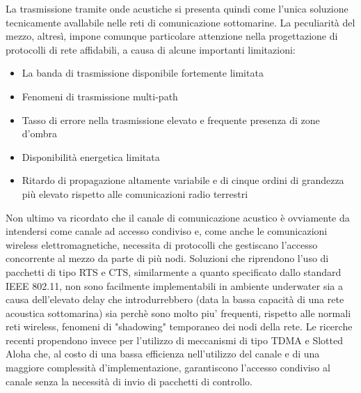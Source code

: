 \documentclass[Lau,binding=0.6cm]{sapthesis}
\begin{document}
La trasmissione tramite onde acustiche si presenta quindi come l'unica soluzione tecnicamente avallabile nelle reti di comunicazione sottomarine. La peculiarità del mezzo, altresì, impone comunque particolare attenzione nella progettazione di protocolli di rete affidabili, a causa di alcune importanti limitazioni:
\begin{itemize}

\item La banda di trasmissione disponibile fortemente limitata

\item Fenomeni di trasmissione multi-path

\item Tasso di errore nella trasmissione elevato e frequente presenza di zone d'ombra

\item Disponibilità energetica limitata

\item Ritardo di propagazione altamente variabile e di cinque ordini di grandezza più elevato rispetto alle comunicazioni radio terrestri
\end{itemize}

Non ultimo va ricordato che il canale di comunicazione acustico è ovviamente da intendersi come canale ad accesso condiviso e, come anche le comunicazioni wireless elettromagnetiche, necessita di protocolli che gestiscano l'accesso concorrente al mezzo da parte di più nodi. Soluzioni che riprendono l'uso di pacchetti di tipo RTS e CTS, similarmente a quanto specificato dallo standard IEEE 802.11, non sono facilmente implementabili in ambiente underwater sia a causa dell'elevato delay che introdurrebbero (data la bassa capacità di una rete acoustica sottomarina) sia perchè sono molto piu' frequenti, rispetto alle normali reti wireless, fenomeni di "shadowing" temporaneo dei nodi della rete. Le ricerche recenti propendono invece per l'utilizzo di meccanismi di tipo TDMA e Slotted Aloha che, al costo di una bassa efficienza nell'utilizzo del canale e di una maggiore complessità d'implementazione, garantiscono l'accesso condiviso al canale senza la necessità di invio di pacchetti di controllo.
\end{document}
